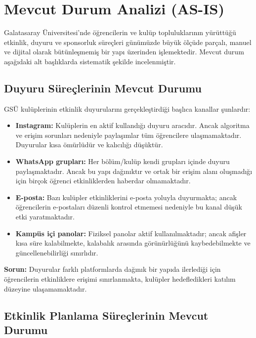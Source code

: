 \documentclass[a4paper,12pt]{report}
\begin{document}
\section{Mevcut Durum Analizi (AS-IS)}

Galatasaray Üniversitesi'nde öğrencilerin ve kulüp topluluklarının yürüttüğü etkinlik, duyuru ve sponsorluk süreçleri günümüzde büyük ölçüde parçalı, manuel ve dijital olarak bütünleşmemiş bir yapı üzerinden işlemektedir. Mevcut durum aşağıdaki alt başlıklarda sistematik şekilde incelenmiştir.

\subsection{Duyuru Süreçlerinin Mevcut Durumu}

GSÜ kulüplerinin etkinlik duyurularını gerçekleştirdiği başlıca kanallar şunlardır:

\begin{itemize}
    \item \textbf{Instagram:} Kulüplerin en aktif kullandığı duyuru aracıdır. Ancak algoritma ve erişim sorunları nedeniyle paylaşımlar tüm öğrencilere ulaşmamaktadır. Duyurular kısa ömürlüdür ve kalıcılığı düşüktür.

    \item \textbf{WhatsApp grupları:} Her bölüm/kulüp kendi grupları içinde duyuru paylaşmaktadır. Ancak bu yapı dağınıktır ve ortak bir erişim alanı oluşmadığı için birçok öğrenci etkinliklerden haberdar olmamaktadır.

    \item \textbf{E-posta:} Bazı kulüpler etkinliklerini e-posta yoluyla duyurmakta; ancak öğrencilerin e-postaları düzenli kontrol etmemesi nedeniyle bu kanal düşük etki yaratmaktadır.

    \item \textbf{Kampüs içi panolar:} Fiziksel panolar aktif kullanılmaktadır; ancak afişler kısa süre kalabilmekte, kalabalık arasında görünürlüğünü kaybedebilmekte ve güncellenebilirliği sınırlıdır.
\end{itemize}

\textbf{Sorun:} Duyurular farklı platformlarda dağınık bir yapıda ilerlediği için öğrencilerin etkinliklere erişimi sınırlanmakta, kulüpler hedefledikleri katılım düzeyine ulaşamamaktadır.

\subsection{Etkinlik Planlama Süreçlerinin Mevcut Durumu}
\end{document}
